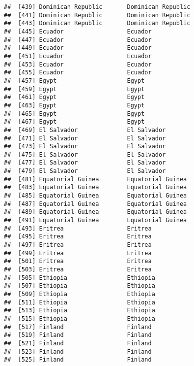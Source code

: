 \documentclass[]{article}
\begin{document}
\begin{verbatim}
##  [439] Dominican Republic       Dominican Republic      
##  [441] Dominican Republic       Dominican Republic      
##  [443] Dominican Republic       Dominican Republic      
##  [445] Ecuador                  Ecuador                 
##  [447] Ecuador                  Ecuador                 
##  [449] Ecuador                  Ecuador                 
##  [451] Ecuador                  Ecuador                 
##  [453] Ecuador                  Ecuador                 
##  [455] Ecuador                  Ecuador                 
##  [457] Egypt                    Egypt                   
##  [459] Egypt                    Egypt                   
##  [461] Egypt                    Egypt                   
##  [463] Egypt                    Egypt                   
##  [465] Egypt                    Egypt                   
##  [467] Egypt                    Egypt                   
##  [469] El Salvador              El Salvador             
##  [471] El Salvador              El Salvador             
##  [473] El Salvador              El Salvador             
##  [475] El Salvador              El Salvador             
##  [477] El Salvador              El Salvador             
##  [479] El Salvador              El Salvador             
##  [481] Equatorial Guinea        Equatorial Guinea       
##  [483] Equatorial Guinea        Equatorial Guinea       
##  [485] Equatorial Guinea        Equatorial Guinea       
##  [487] Equatorial Guinea        Equatorial Guinea       
##  [489] Equatorial Guinea        Equatorial Guinea       
##  [491] Equatorial Guinea        Equatorial Guinea       
##  [493] Eritrea                  Eritrea                 
##  [495] Eritrea                  Eritrea                 
##  [497] Eritrea                  Eritrea                 
##  [499] Eritrea                  Eritrea                 
##  [501] Eritrea                  Eritrea                 
##  [503] Eritrea                  Eritrea                 
##  [505] Ethiopia                 Ethiopia                
##  [507] Ethiopia                 Ethiopia                
##  [509] Ethiopia                 Ethiopia                
##  [511] Ethiopia                 Ethiopia                
##  [513] Ethiopia                 Ethiopia                
##  [515] Ethiopia                 Ethiopia                
##  [517] Finland                  Finland                 
##  [519] Finland                  Finland                 
##  [521] Finland                  Finland                 
##  [523] Finland                  Finland                 
##  [525] Finland                  Finland                 

\end{verbatim}
\end{document}
